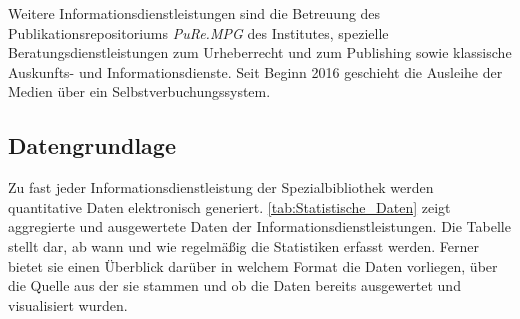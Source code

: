 Weitere Informationsdienstleistungen sind
die Betreuung des Publikationsrepositoriums \textit{\acrshort{PuRe.MPG}} des Institutes, spezielle Beratungsdienstleistungen 
zum Urheberrecht und zum Publishing sowie klassische Auskunfts- und Informationsdienste. Seit Beginn 2016 
geschieht die Ausleihe der Medien über ein Selbstverbuchungssystem.


\subsection{Datengrundlage}

Zu fast jeder Informationsdienstleistung der Spezialbibliothek werden quantitative Daten elektronisch generiert. 
\autoref{tab:Statistische_Daten} zeigt aggregierte und ausgewertete Daten der Informationsdienstleistungen. Die Tabelle stellt dar, ab wann 
und wie regelmäßig die Statistiken erfasst werden. Ferner bietet sie einen Überblick darüber in welchem 
Format die Daten vorliegen, über die Quelle aus der sie stammen und ob die Daten bereits ausgewertet und visualisiert wurden.


